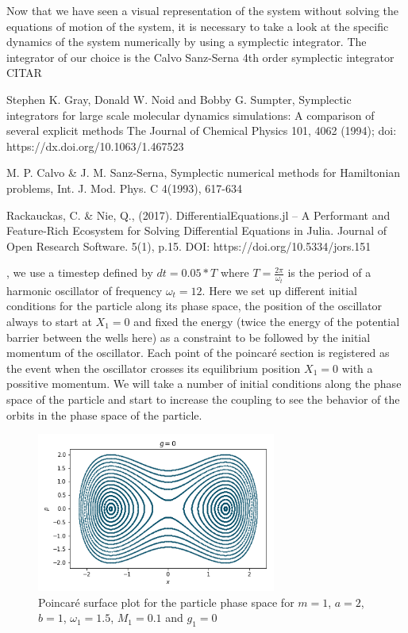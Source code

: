 Now that we have seen a visual representation of the system without solving the equations of motion of the system, it is necessary to take a look at the specific dynamics of the system numerically by using a symplectic integrator. The integrator of our choice is the Calvo Sanz-Serna 4th order symplectic integrator CITAR 

Stephen K. Gray, Donald W. Noid and Bobby G. Sumpter, Symplectic integrators for large scale molecular dynamics simulations: A comparison of several explicit methods The Journal of Chemical Physics 101, 4062 (1994); doi: https://dx.doi.org/10.1063/1.467523

M. P. Calvo & J. M. Sanz-Serna, Symplectic numerical methods for Hamiltonian problems, Int. J. Mod. Phys. C 4(1993), 617-634

Rackauckas, C. & Nie, Q., (2017). DifferentialEquations.jl – A Performant and Feature-Rich Ecosystem for Solving Differential Equations in Julia. Journal of Open Research Software. 5(1), p.15. DOI: https://doi.org/10.5334/jors.151

, we use a timestep defined by $dt=0.05*T$ where $T=\frac{2\pi}{\omega_t}$ is the period of a harmonic oscillator of frequency $\omega_t=12$. Here we set up different initial conditions for the particle along its phase space, the position of the oscillator always to start at $X_1=0$ and fixed the energy (twice the energy of the potential barrier between the wells here) as a constraint to be followed by the initial momentum of the oscillator. Each point of the poincaré section is registered as the event when the oscillator crosses its equilibrium position $X_1=0$ with a possitive momentum. We will take a number of initial conditions along the phase space of the particle and start to increase the coupling to see the behavior of the orbits in the phase space of the particle.

\begin{figure}[H]
\centering
\includegraphics[width=0.7\textwidth]{Figures/poincare_g0.png}
\caption{Poincaré surface plot for the particle phase space for $m=1$, $a=2$, $b=1$, $\omega_1=1.5$, $M_1=0.1$ and $g_1=0$\label{fig:poinc_g0}
}
\end{figure}

